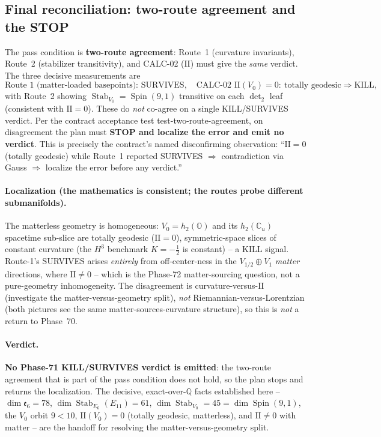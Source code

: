 \subsection{Final reconciliation: two-route agreement and the STOP}
\label{sec:71-two-route-agreement}

The pass condition is \textbf{two-route agreement}: Route~1 (curvature invariants),
Route~2 (stabilizer transitivity), and CALC-02 ($\mathrm{II}$) must give the
\emph{same} verdict. The three decisive measurements are
\[
\text{Route 1 (matter-loaded basepoints): SURVIVES},\quad
\text{CALC-02 } \mathrm{II}(V_0)=0:\ \text{totally geodesic} \Rightarrow \text{KILL},
\]
with Route~2 showing $\operatorname{Stab}_{V_0}=\operatorname{Spin}(9,1)$ transitive
on each $\det_2$ leaf (consistent with $\mathrm{II}=0$). These do \emph{not}
co-agree on a single KILL/SURVIVES verdict. Per the contract acceptance test
\textsf{test-two-route-agreement}, on disagreement the plan must \textbf{STOP and
localize the error and emit no verdict}. This is precisely the contract's named
disconfirming observation: ``$\mathrm{II}=0$ (totally geodesic) while Route~1
reported SURVIVES $\Rightarrow$ contradiction via Gauss $\Rightarrow$ localize the
error before any verdict.''

\paragraph{Localization (the mathematics is consistent; the routes probe different
submanifolds).} The matterless geometry is homogeneous: $V_0=h_2(\mathbb{O})$ and its
$h_2(\mathbb{C}_u)$ spacetime sub-slice are totally geodesic ($\mathrm{II}=0$),
symmetric-space slices of constant curvature (the $H^3$ benchmark $K=-\tfrac12$ is
constant) -- a KILL signal. Route-1's SURVIVES arises \emph{entirely} from
off-center-ness in the $V_{1/2}\oplus V_1$ \emph{matter} directions, where
$\mathrm{II}\neq 0$ -- which is the Phase-72 matter-sourcing question, not a
pure-geometry inhomogeneity. The disagreement is curvature-versus-$\mathrm{II}$
(investigate the matter-versus-geometry split), \emph{not} Riemannian-versus-Lorentzian
(both pictures see the same matter-sources-curvature structure), so this is
\emph{not} a return to Phase~70.

\paragraph{Verdict.} \textbf{No Phase-71 KILL/SURVIVES verdict is emitted}: the
two-route agreement that is part of the pass condition does not hold, so the plan
stops and returns the localization. The decisive, exact-over-$\mathbb{Q}$ facts
established here -- $\dim\mathfrak{e}_6=78$, $\dim\operatorname{Stab}_{E_6}(E_{11})=61$,
$\dim\operatorname{Stab}_{V_0}=45=\dim\operatorname{Spin}(9,1)$, the $V_0$ orbit
$9<10$, $\mathrm{II}(V_0)=0$ (totally geodesic, matterless), and $\mathrm{II}\neq 0$
with matter -- are the handoff for resolving the matter-versus-geometry split.

